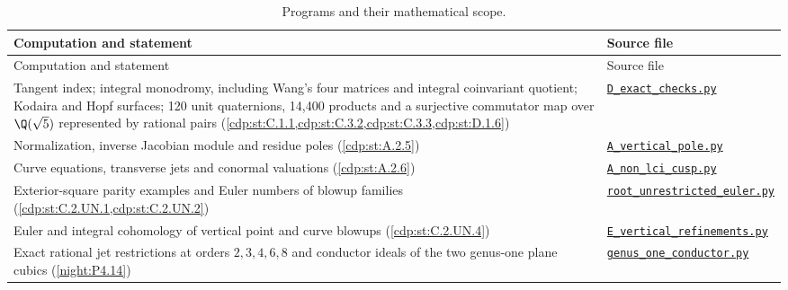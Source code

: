 \begin{longtable}{@{}>{\raggedright\arraybackslash}p{}>{\raggedright\arraybackslash}p{}@{}}
\caption{Programs and their mathematical scope.}\label{tab:II:programs}\\
\toprule Computation and statement & Source file \\
\midrule\endfirsthead
\toprule Computation and statement & Source file \\
\midrule\endhead
\bottomrule\endfoot
Tangent index; integral monodromy, including Wang's four matrices and integral coinvariant quotient; Kodaira and Hopf surfaces; 120 unit quaternions, 14,400 products and a surjective commutator map over $\Q(\sqrt5)$ represented by rational pairs (\cref{cdp:st:C.1.1,cdp:st:C.3.2,cdp:st:C.3.3,cdp:st:D.1.6}) & \href{https://raw.githubusercontent.com/KokunoYumeto/s6-complex-structure-workbench/\SsixRepositoryCommit/pro_returns/S6_03_CDP_checkpoint_13_20261116T0136Z/S6_03_CDP/code/D_exact_checks.py}{\nolinkurl{D_exact_checks.py}} \\[3pt]
Normalization, inverse Jacobian module and residue poles (\cref{cdp:st:A.2.5}) & \href{https://raw.githubusercontent.com/KokunoYumeto/s6-complex-structure-workbench/\SsixRepositoryCommit/pro_returns/S6_03_CDP_checkpoint_13_20261116T0136Z/S6_03_CDP/code/A_vertical_pole.py}{\nolinkurl{A_vertical_pole.py}} \\[3pt]
Curve equations, transverse jets and conormal valuations (\cref{cdp:st:A.2.6}) & \href{https://raw.githubusercontent.com/KokunoYumeto/s6-complex-structure-workbench/\SsixRepositoryCommit/pro_returns/S6_03_CDP_checkpoint_13_20261116T0136Z/S6_03_CDP/code/A_non_lci_cusp.py}{\nolinkurl{A_non_lci_cusp.py}} \\[3pt]
Exterior-square parity examples and Euler numbers of blowup families (\cref{cdp:st:C.2.UN.1,cdp:st:C.2.UN.2}) & \href{https://raw.githubusercontent.com/KokunoYumeto/s6-complex-structure-workbench/\SsixRepositoryCommit/pro_returns/S6_03_CDP_checkpoint_13_20261116T0136Z/S6_03_CDP/code/root_unrestricted_euler.py}{\nolinkurl{root_unrestricted_euler.py}} \\[3pt]
Euler and integral cohomology of vertical point and curve blowups (\cref{cdp:st:C.2.UN.4}) & \href{https://raw.githubusercontent.com/KokunoYumeto/s6-complex-structure-workbench/\SsixRepositoryCommit/pro_returns/S6_03_CDP_checkpoint_13_20261116T0136Z/S6_03_CDP/code/E_vertical_refinements.py}{\nolinkurl{E_vertical_refinements.py}} \\[3pt]
Exact rational jet restrictions at orders $2,3,4,6,8$ and conductor ideals of the two genus-one plane cubics (\cref{night:P4.14}) & \href{https://raw.githubusercontent.com/KokunoYumeto/s6-complex-structure-workbench/\SsixRepositoryCommit/pro_returns/S6_06_BLIND_checkpoint_15_20261117T1457Z/S6_06_BLIND/code/part4/genus_one_conductor.py}{\nolinkurl{genus_one_conductor.py}} \\[3pt]

\end{longtable}
